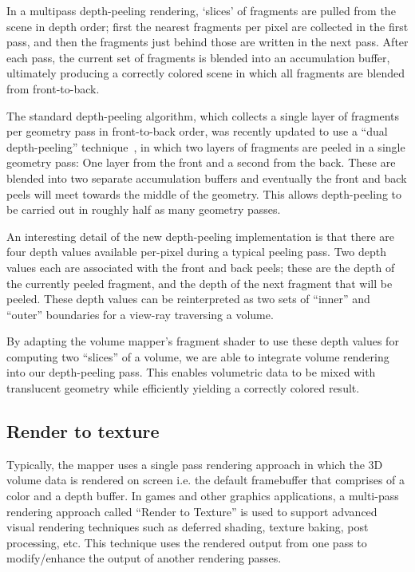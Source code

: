 In a multipass depth-peeling rendering, `slices' of fragments are pulled from
the scene in depth order; first the nearest fragments per pixel are collected in
the first pass, and then the fragments just behind those are written in the next
pass. After each pass, the current set of fragments is blended into an
accumulation buffer, ultimately producing a correctly colored scene in which all
fragments are blended from front-to-back.

The standard depth-peeling algorithm, which collects a single layer of fragments
per geometry pass in front-to-back order, was recently updated to use a ``dual
depth-peeling'' technique~\citep{bavoil_order_2008}, in which two layers of
fragments are peeled in a single geometry pass: One layer from the front and a
second from the back. These are blended into two separate accumulation buffers
and eventually the front and back peels will meet towards the middle of the
geometry. This allows depth-peeling to be carried out in roughly half as many
geometry passes.

An interesting detail of the new depth-peeling implementation is that there are
four depth values available per-pixel during a typical peeling pass. Two depth
values each are associated with the front and back peels; these are the depth of
the currently peeled fragment, and the depth of the next fragment that will be
peeled. These depth values can be reinterpreted as two sets of ``inner'' and
``outer'' boundaries for a view-ray traversing a volume.

By adapting the volume mapper's fragment shader to use these depth values for
computing two ``slices'' of a volume, we are able to integrate volume rendering
into our depth-peeling pass. This enables volumetric data to be mixed with
translucent geometry while efficiently yielding a correctly colored result.

\subsection{Render to texture}
Typically, the mapper uses a single pass
rendering approach in which the 3D volume data is rendered on screen i.e. the
default framebuffer that comprises of a color and a depth buffer. In games and
other graphics applications, a multi-pass rendering approach called ``Render to
Texture'' is used to support advanced visual rendering techniques such as
deferred shading, texture baking, post processing, etc. This technique uses the
rendered output from one pass to modify/enhance the output of another rendering
passes.

